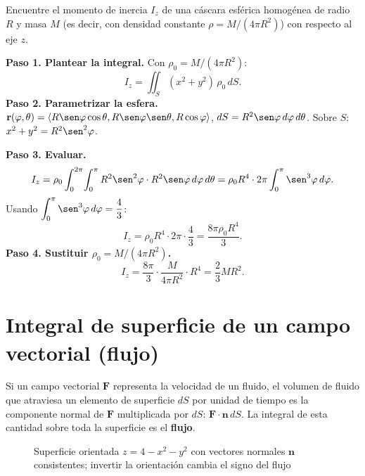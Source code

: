 \begin{prob}
Encuentre el momento de inercia $I_z$ de una cáscara esférica homogénea de radio $R$ y masa $M$ (es decir, con densidad constante $\rho = M/(4\pi R^2)$) con respecto al eje $z$.
\begin{myproof}
\textbf{Paso 1. Plantear la integral.} Con $\rho_0=M/(4\pi R^2)$:
\[
I_z=\iint_S(x^2+y^2)\,\rho_0\,dS.
\]
\textbf{Paso 2. Parametrizar la esfera.} $\mathbf{r}(\varphi,\theta)=\langle R\sen\varphi\cos\theta,R\sen\varphi\sen\theta,R\cos\varphi\rangle$, $dS=R^2\sen\varphi\,d\varphi\,d\theta$. Sobre $S$: $x^2+y^2=R^2\sen^2\varphi$.

\textbf{Paso 3. Evaluar.}
\[
I_z=\rho_0\int_0^{2\pi}\!\int_0^{\pi}R^2\sen^2\varphi\cdot R^2\sen\varphi\,d\varphi\,d\theta
=\rho_0 R^4\cdot2\pi\int_0^{\pi}\sen^3\varphi\,d\varphi.
\]
Usando $\displaystyle\int_0^\pi\sen^3\varphi\,d\varphi=\frac{4}{3}$:
\[
I_z=\rho_0 R^4\cdot2\pi\cdot\frac{4}{3}=\frac{8\pi\rho_0 R^4}{3}.
\]
\textbf{Paso 4. Sustituir $\rho_0=M/(4\pi R^2)$.}
\[
I_z=\frac{8\pi}{3}\cdot\frac{M}{4\pi R^2}\cdot R^4=\boxed{\dfrac{2}{3}MR^2}.
\]
\end{myproof}
\end{prob}

\section{Integral de superficie de un campo vectorial (flujo)}

Si un campo vectorial $\mathbf{F}$ representa la velocidad de un fluido, el volumen de fluido que atraviesa un elemento de superficie $dS$ por unidad de tiempo es la componente normal de $\mathbf{F}$ multiplicada por $dS$: $\mathbf{F}\cdot\mathbf{n}\,dS$. La integral de esta cantidad sobre toda la superficie es el \textbf{flujo}.

\begin{figure}[!htbp]
\centering
{}
\caption{Superficie orientada $z=4-x^2-y^2$ con vectores normales $\mathbf{n}$
         consistentes; invertir la orientación cambia el signo del flujo}
\label{fig:superficie_orientada}
\end{figure}


